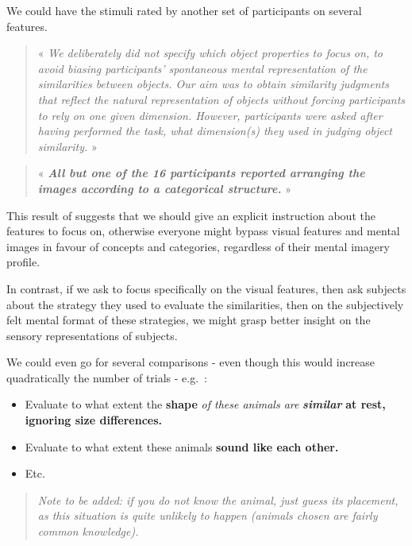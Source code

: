 \documentclass[
  authoryear]{elsarticle}
\begin{document}
We could have the stimuli rated by another set of participants on
several features.

\begin{quote}
« \emph{We deliberately did not specify which object properties to focus
on, to avoid biasing participants' spontaneous mental representation of
the similarities between objects. Our aim was to obtain similarity
judgments that reflect the natural representation of objects without
forcing participants to rely on one given dimension. However,
participants were asked after having performed the task, what
dimension(s) they used in judging object similarity.} »
\citep{jozwik2016}
\end{quote}

\begin{quote}
« \textbf{\emph{All but one of the 16 participants reported arranging
the images according to a categorical structure.}} » \citep{jozwik2017}
\end{quote}

This result of \citet{jozwik2017} suggests that we should give an
explicit instruction about the features to focus on, otherwise everyone
might bypass visual features and mental images in favour of concepts and
categories, regardless of their mental imagery profile.

In contrast, if we ask to focus specifically on the visual features,
then ask subjects about the strategy they used to evaluate the
similarities, then on the subjectively felt mental format of these
strategies, we might grasp better insight on the sensory representations
of subjects.

We could even go for several comparisons - even though this would
increase quadratically the number of trials - e.g.~:

\begin{itemize}
\item
  Evaluate to what extent the \textbf{shape} \emph{of these animals are}
  \textbf{\emph{similar}} \textbf{at rest, ignoring size differences.}
\item
  Evaluate to what extent these animals \textbf{sound like each other.}
\item
  Etc.
\end{itemize}

\begin{quote}
\emph{Note to be added: if you do not know the animal, just guess its
placement, as this situation is quite unlikely to happen (animals chosen
are fairly common knowledge).}
\end{quote}
\end{document}
